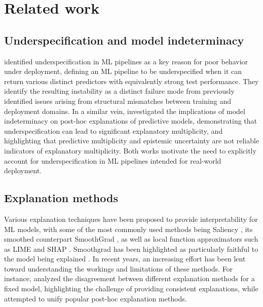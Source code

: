 \section{Related work}
\label{sec:related}

\subsection{Underspecification and model indeterminacy}

\citet{damour2022} identified underspecification in ML pipelines as a key reason for poor behavior under deployment, defining an ML pipeline to be underspecified when it can return various distinct predictors with equivalently strong test performance. They identify the resulting instability as a distinct failure mode from previously identified issues arising from structural mismatches between training and deployment domains. In a similar vein, \citet{brunet2022} investigated the implications of model indeterminacy on post-hoc explanations of predictive models, demonstrating that underspecification can lead to significant explanatory multiplicity, and highlighting that predictive multiplicity and epistemic uncertainty are not reliable indicators of explanatory multiplicity. Both works motivate the need to explicitly account for underspecification in ML pipelines intended for real-world deployment.


\subsection{Explanation methods}

Various explanation techniques have been proposed to provide interpretability for ML models, with some of the most commonly used methods being Saliency \citep{simonyan2013}, its smoothed counterpart SmoothGrad \citep{smoothgrad2017}, as well as local function approximators such as LIME \citep{ribeiro2016} and SHAP \citep{lundberg2017}. Smoothgrad has been highlighted as particularly faithful to the model being explained \citep{agarwal2022}. In recent years, an increasing effort has been lent toward understanding the workings and limitations of these methods. For instance, \citet{krishna2022} analyzed the disagreement between different explanation methods for a fixed model, highlighting the challenge of providing consistent explanations, while \citet{han2022} attempted to unify popular post-hoc explanation methods.

